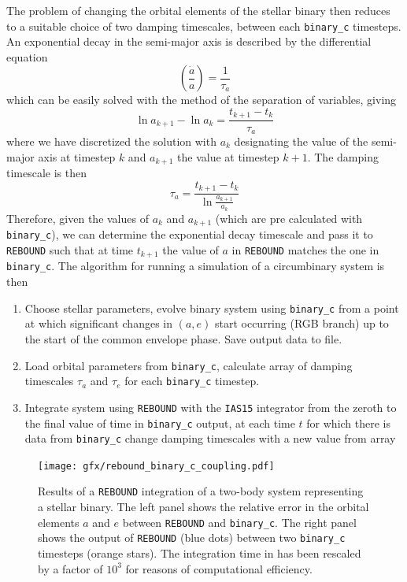 \documentclass[twoside,openright,titlepage,numbers=noenddot,headinclude,%
                footinclude=true,cleardoublepage=empty,abstractoff, 
                BCOR=5mm,paper=a4,fontsize=11pt,%
                american,%
                ]{scrreprt}%
\begin{document}
The problem of changing the orbital elements of the stellar binary then reduces
to a suitable choice of two damping timescales, between each \texttt{binary\_c}
timesteps. An exponential decay in the semi-major axis is described by
the differential equation
\begin{equation}
    \left( \frac{\dot{a}}{a} \right)= \frac{1}{\tau_a} 
\end{equation}
which can be easily solved with the method of the separation of variables, giving
\begin{equation}
    \ln a_{k+1}-\ln a_k= \frac{t_{k+1}-t_k}{\tau_a} 
\end{equation}
where we have discretized the solution with $a_k$ designating the value of the
semi-major axis at timestep $k$ and $a_{k+1}$ the value at timestep $k+1$. The
damping timescale is then
\begin{equation}
    \tau_a = \frac{t_{k+1}-t_k}{\ln \frac{a_{k+1}}{a_k} } 
\end{equation}
Therefore, given the values of $a_k$ and $a_{k+1}$ (which are pre calculated with
\texttt{binary\_c}), we can determine the exponential decay timescale and pass 
it to \texttt{REBOUND} such that at time $t_{k+1}$ the value of $a$ in 
\texttt{REBOUND} matches the one in \texttt{binary\_c}. The algorithm for
running a simulation of a circumbinary system is then
\begin{enumerate}
    \item Choose stellar parameters, evolve binary system using \texttt{binary\_c}
        from a point at which significant changes in $(a,e)$ start occurring (RGB 
        branch) up to the start of the common envelope phase. Save output data
        to file.
    \item Load orbital parameters from \texttt{binary\_c}, calculate array of
        damping timescales $\tau_a$ and $\tau_e$ for each \texttt{binary\_c}
        timestep.
    \item Integrate system using \texttt{REBOUND} with the \texttt{IAS15} integrator
        from the zeroth to the final value of time in \texttt{binary\_c} output, at
        each time $t$ for which there is data from \texttt{binary\_c} change 
        damping timescales with a new value from array
\end{enumerate}
\begin{figure}[!t]
\centering
\texttt{[image: gfx/rebound\_binary\_c\_coupling.pdf]}
    \caption[Coupling between \texttt{REBOUND} and \texttt{binary\_c}]{Results 
    of a \texttt{REBOUND} integration of a two-body system representing
    a stellar binary. The left panel shows the relative error in the orbital elements
    $a$ and $e$ between \texttt{REBOUND} and \texttt{binary\_c}. The right panel
    shows the output of \texttt{REBOUND} (blue dots) between two \texttt{binary\_c}
    timesteps (orange stars). The integration time in  has been
    rescaled by a factor of $10^3$ for reasons of computational efficiency.}
\label{fig:reb_bin_coupling}
\end{figure}
\end{document}
